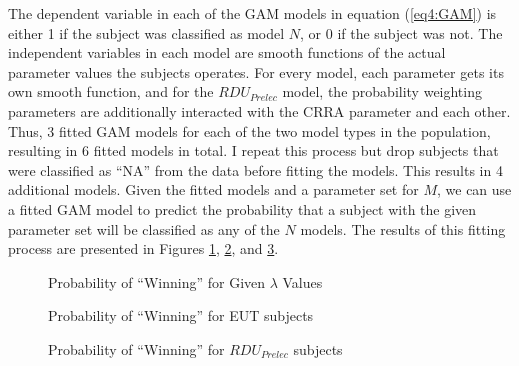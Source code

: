 \documentclass[../main.tex]{subfiles}
\begin{document}
The dependent variable in each of the GAM models in equation (\ref{eq4:GAM}) is either 1 if the subject was classified as model $N$, or 0 if the subject was not.
The independent variables in each model are smooth functions of the actual parameter values the subjects operates.
For every model, each parameter gets its own smooth function, and for the $\mathit{RDU_{Prelec}}$ model, the probability weighting parameters are additionally interacted with the CRRA parameter and each other.
Thus, 3 fitted GAM models for each of the two model types in the population, resulting in 6 fitted models in total.
I repeat this process but drop subjects that were classified as \enquote{NA} from the data before fitting the models.
This results in 4 additional models.
Given the fitted models and a parameter set for $M$, we can use a fitted GAM model to predict the probability that a subject with the given parameter set will be classified as any of the $N$ models.
The results of this fitting process are presented in Figures \ref{fig:HNG1_win_mu}, \ref{fig:HNG1_win_eut}, and \ref{fig:HNG1_win_pre}.

\begin{figure}[hp!]
	\center
	\caption{Probability of \enquote{Winning} for Given $\lambda$ Values}
	\label{fig:HNG1_win_mu}
\end{figure}

\begin{figure}[hp!]
	\center
	\caption{Probability of \enquote{Winning} for EUT subjects}
	\label{fig:HNG1_win_eut}
\end{figure}

\begin{figure}[hp!]
	\center
	\caption{Probability of \enquote{Winning} for $\mathit{RDU_{Prelec}}$ subjects}
	\label{fig:HNG1_win_pre}
\end{figure}
\end{document}
